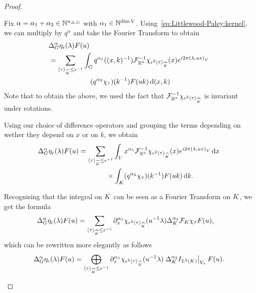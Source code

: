 \begin{proof}
\begin{description}
            Fix $\alpha = \alpha_1 + \alpha_2 \in \N^{\dimDifferenceOperators}$ with $\alpha_1 \in \N^{\dim \VectorSpace}$.
            Using~\eqref{eq:Littlewood-Paley:kernel},
            we can multiply by $q^\alpha$ and take the Fourier Transform to obtain
            \begin{align*}
                &\DifferenceOperatorOrder \alpha \eta_\epsilon(\lambda) F(u)\\
                &= \sum_{\JapaneseBracket \CompactGroup \tau \leq \epsilon^{-1}} \int_\Group
                q^{\alpha_1}((x, k)^{-1}) \InverseFourier [\R^n] \chi_{\epsilon^2 \JapaneseBracket \CompactGroup \tau}(x) \e^{\i \turn \ip \lambda {u x}}\\
                & \qquad \qquad \qquad (q^{\alpha_2} \chi_\tau)(k^{-1}) F(u k) \dd (x, k)
            \end{align*}
            Note that to obtain the above,
            we used the fact that $\InverseFourier [\R^n] \chi_{\epsilon^2 \JapaneseBracket \CompactGroup \tau}$ is invariant under rotations.

            Using our choice of difference operators and grouping the terms depending on
            wether they depend on $x$ or on $k$,
            we obtain
            \begin{align*}
                \DifferenceOperatorOrder \alpha \eta_\epsilon(\lambda) F(u)
                &= \sum_{\JapaneseBracket \CompactGroup \tau \leq \epsilon^{-1}}
                \int_\VectorSpace x^{\alpha_1} \InverseFourier [\R^n] \chi_{\epsilon^2 \JapaneseBracket \CompactGroup \tau}(x) \e^{\i \turn \ip \lambda {u x}} \dd x\\
                & \qquad \qquad \times \int_\CompactGroup (q^{\alpha_2} \chi_\tau)(k^{-1}) F(u k) \dd k.
            \end{align*}

            Recognising that the integral on $\CompactGroup$ can be seen as a Fourier Transform on $\CompactGroup$,
            we get the formula
            \begin{align*}
                \DifferenceOperatorOrder \alpha \eta_\epsilon(\lambda) F(u)
                &= \sum_{\JapaneseBracket \CompactGroup \tau \leq \epsilon^{-1}}
                \iD {x^{\alpha_1} } \chi_{\epsilon^2 \JapaneseBracket \CompactGroup \tau}(u^{-1} \lambda)
                \DifferenceOperatorOrder [\CompactGroup] {\alpha_2} \Fourier [\CompactGroup] \chi_\tau F(u),
            \end{align*}
            which can be rewritten more elegantly as follows
            \begin{align}
                \DifferenceOperatorOrder \alpha \eta_\epsilon(\lambda) F(u)
                = \bigoplus_{\JapaneseBracket \CompactGroup \tau \leq \epsilon^{-1}}
                \iD {x^{\alpha_1} } \chi_{\epsilon^2 \JapaneseBracket \CompactGroup \tau}(u^{-1} \lambda)
                \eval {\DifferenceOperatorOrder [\CompactGroup] {\alpha_2} \Id {\Lebesgue 2 \CompactGroup}} {V_\tau} F(u).
                \label{eq:Littlewood-Paley:difference_operators}
            \end{align}


\end{description}
\end{proof}

